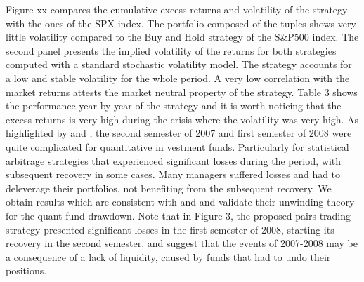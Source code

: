 \documentclass[11pt,a4,twosided,singlespacing,titlepagenumber=on]{scrreprt}
\numberwithin{equation}{chapter} %
\theoremstyle{remark}
\begin{document}
\noindent
Figure xx compares the cumulative excess returns and volatility of the strategy with the ones of the SPX index. The portfolio composed of the tuples shows very little volatility compared to the Buy and Hold strategy of the S\&P500 index. The second panel presents the implied volatility of the returns for both strategies computed with a standard stochastic volatility model. The strategy accounts for a low and stable volatility for the whole period. A very low correlation with the market returns attests the market neutral property of the strategy. Table 3 shows the performance year by year of the strategy and it is worth noticing that the excess returns is very high during the crisis where the volatility was very high. As highlighted by \cite{khandani2007} and \cite{avellaneda2010}, the second semester of 2007 and first semester of 2008 were quite complicated for quantitative in vestment funds. Particularly for statistical arbitrage strategies that experienced significant losses during the period, with subsequent recovery in some cases. Many managers suffered losses and had to deleverage their portfolios, not benefiting from the subsequent recovery. We obtain results which are consistent with \cite{khandani2007} and \cite{avellaneda2010} and validate their unwinding theory for the quant fund drawdown. Note that in Figure 3, the proposed pairs trading strategy presented significant losses in the first semester of 2008, starting its recovery in the second semester. \cite{khandani2007} and \cite{avellaneda2010} suggest that the events of 2007-2008 may be a consequence of a lack of liquidity, caused by funds that had to undo their positions.



\end{document}
